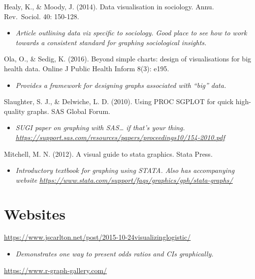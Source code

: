 \documentclass[
]{book}
\providecommand{\tightlist}{%
  \setlength{\itemsep}{0pt}\setlength{\parskip}{0pt}}
\begin{document}
Healy, K., \& Moody, J. (2014). Data visualisation in sociology. Annu. Rev.~Sociol. 40: 150-128.

\begin{itemize}
\tightlist
\item
  \emph{Article outlining data viz specific to sociology. Good place to see how to work towards a consistent standard for graphing sociological insights.}
\end{itemize}

Ola, O., \& Sedig, K. (2016). Beyond simple charts: design of visualisations for big health data. Online J Public Health Inform 8(3): e195.

\begin{itemize}
\tightlist
\item
  \emph{Provides a framework for designing graphs associated with ``big'' data.}
\end{itemize}

Slaughter, S. J., \& Delwiche, L. D. (2010). Using PROC SGPLOT for quick high-quality graphs. SAS Global Forum.

\begin{itemize}
\tightlist
\item
  \emph{SUGI paper on graphing with SAS\ldots{} if that's your thing. \url{https://support.sas.com/resources/papers/proceedings10/154-2010.pdf}}
\end{itemize}

Mitchell, M. N. (2012). A visual guide to stata graphics. Stata Press.

\begin{itemize}
\tightlist
\item
  \emph{Introductory textbook for graphing using STATA. Also has accompanying website \url{https://www.stata.com/support/faqs/graphics/gph/stata-graphs/}}
\end{itemize}

\section{Websites}\label{websites-1}

\url{https://www.jscarlton.net/post/2015-10-24visualizinglogistic/}

\begin{itemize}
\tightlist
\item
  \emph{Demonstrates one way to present odds ratios and CIs graphically.}
\end{itemize}

\url{https://www.r-graph-gallery.com/}
\end{document}
